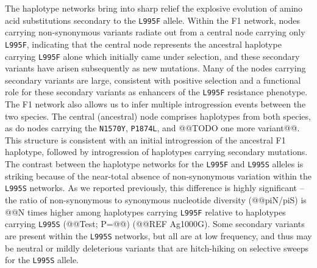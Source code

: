 \documentclass[a4paper,11pt,abstracton,hidelinks]{scrartcl}
\begin{document}
%
The haplotype networks bring into sharp relief the explosive evolution of amino acid substitutions secondary to the \texttt{L995F} allele.
%
Within the F1 network, nodes carrying non-synonymous variants radiate out from a central node carrying only \texttt{L995F}, indicating that the central node represents the ancestral haplotype carrying \texttt{L995F} alone which initially came under selection, and these secondary variants have arisen subsequently as new mutations.
%
Many of the nodes carrying secondary variants are large, consistent with positive selection and a functional role for these secondary variants as enhancers of the \texttt{L995F} resistance phenotype.
%
The F1 network also allows us to infer multiple introgression events between the two species.
%
The central (ancestral) node comprises haplotypes from both species, as do nodes carrying the \texttt{N1570Y}, \texttt{P1874L}, and @@TODO one more variant@@.
%
This structure is consistent with an initial introgression of the ancestral F1 haplotype, followed by introgression of haplotypes carrying secondary mutations.
%
The contrast between the haplotype networks for the \texttt{L995F} and \texttt{L995S} alleles is striking because of the near-total absence of non-synonymous variation within the \texttt{L995S} networks.
%
As we reported previously, this difference is highly significant -- the ratio of non-synonymous to synonymous nucleotide diversity (@@piN/piS) is @@N times higher among haplotypes carrying \texttt{L995F} relative to haplotypes carrying \texttt{L995S} (@@Test; P=@@) (@@REF Ag1000G).
%
Some secondary variants are present within the \texttt{L995S} networks, but all are at low frequency, and thus may be neutral or mildly deleterious variants that are hitch-hiking on selective sweeps for the \texttt{L995S} allele.
\end{document}
